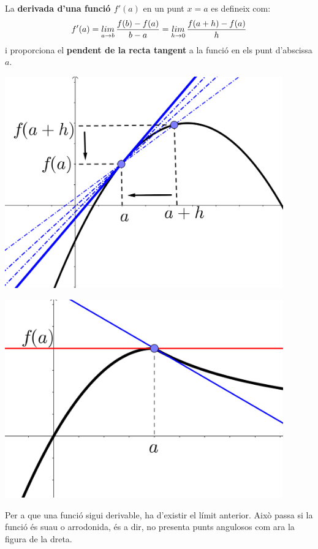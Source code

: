 \begin{theorybox}
	

		La \textbf{derivada d'una funció $f'(a)$} en un punt $x=a$ es defineix com:
	\begin{equation}
	\label{eq:defderiv}
	f'(a)  = \limx[a]{b}\frac{f(b)-f(a)}{b-a} = \limx[h]{0}\frac{f(a+h)-f(a)}{h}
	\end{equation}
	i proporciona el \textbf{pendent de la recta tangent} a la funció en els punt d'abscissa $a$.
	
	\begin{center}
	\begin{minipage}{0.4\textwidth}
		\centering\includegraphics[width=0.9\textwidth]{img-07/rectatangent}
	\end{minipage}
\hspace{0.5cm}
 	\begin{minipage}{0.4\textwidth}
		\centering\includegraphics[width=0.9\textwidth]{img-07/puntangulos}
	\end{minipage}
\end{center}
	
	Per a que una funció sigui derivable, ha d'existir el límit anterior. Això passa si la funció és suau o arrodonida, és a dir, no presenta punts angulosos com ara la figura de la dreta.
\end{theorybox}


